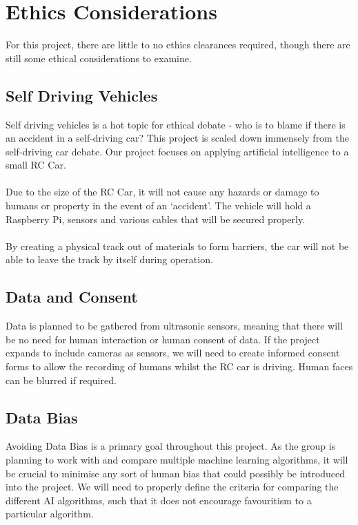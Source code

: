 \documentclass[8pt]{article}
\begin{document}
\newpage




%
%
%

\section{Ethics Considerations}
For this project, there are little to no ethics clearances required, though there are still some ethical considerations to examine.

\subsection{Self Driving Vehicles}
Self driving vehicles is a hot topic for ethical debate - who is to blame if there is an accident in a self-driving car? This project is scaled down immensely from the self-driving car debate.  Our project focuses on applying artificial intelligence to a small RC Car. 
\\\\
Due to the size of the RC Car, it will not cause any hazards or damage to humans or property in the event of an ‘accident’. The vehicle will hold a Raspberry Pi, sensors and various cables that will be secured properly. 
\\\\
By creating a physical track out of materials to form barriers, the car will not be able to leave the track by itself during operation. 

\subsection{Data and Consent}
Data is planned to be gathered from ultrasonic sensors, meaning that there will be no need for human interaction or human consent of data. If the project expands to include cameras as sensors, we will need to create informed consent forms to allow the recording of humans whilst the RC car is driving. Human faces can be blurred if required.

\subsection{Data Bias}
Avoiding Data Bias is a primary goal throughout this project. As the group is planning to work with and compare multiple machine learning algorithms, it will be crucial to minimise any sort of human bias that could possibly be introduced into the project. We will need to properly define the criteria for comparing the different AI algorithms, such that it does not encourage favouritism to a particular algorithm.
\end{document}
